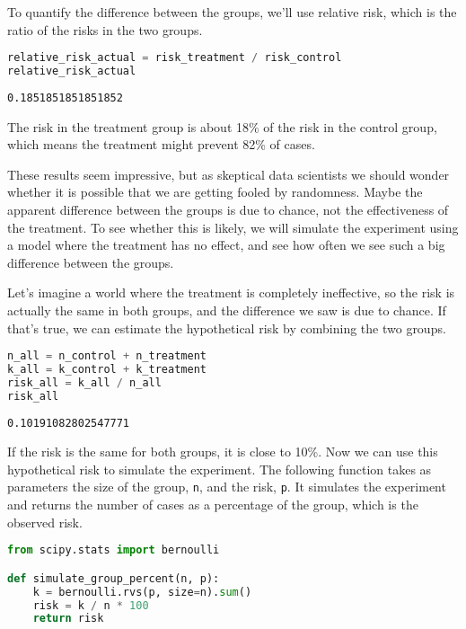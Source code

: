\pagebreak

To quantify the difference between the groups, we'll use relative risk,
which is the ratio of the risks in the two groups.

\begin{lstlisting}[language=Python,style=source]
relative_risk_actual = risk_treatment / risk_control
relative_risk_actual
\end{lstlisting}

\begin{lstlisting}[style=output]
0.1851851851851852
\end{lstlisting}

The risk in the treatment group is about 18\% of the risk in the control
group, which means the treatment might prevent 82\% of cases.

These results seem impressive, but as skeptical data scientists we
should wonder whether it is possible that we are getting fooled by
randomness. Maybe the apparent difference between the groups is due to
chance, not the effectiveness of the treatment. To see whether this is
likely, we will simulate the experiment using a model where the
treatment has no effect, and see how often we see such a big difference
between the groups.

Let's imagine a world where the treatment is completely ineffective, so
the risk is actually the same in both groups, and the difference we saw
is due to chance. If that's true, we can estimate the hypothetical risk
by combining the two groups.

\begin{lstlisting}[language=Python,style=source]
n_all = n_control + n_treatment
k_all = k_control + k_treatment
risk_all = k_all / n_all
risk_all
\end{lstlisting}

\begin{lstlisting}[style=output]
0.10191082802547771
\end{lstlisting}

If the risk is the same for both groups, it is close to 10\%. Now we can
use this hypothetical risk to simulate the experiment. The following
function takes as parameters the size of the group,
\passthrough{\lstinline!n!}, and the risk, \passthrough{\lstinline!p!}.
It simulates the experiment and returns the number of cases as a
percentage of the group, which is the observed risk.

\begin{lstlisting}[language=Python,style=source]
from scipy.stats import bernoulli

def simulate_group_percent(n, p):
    k = bernoulli.rvs(p, size=n).sum()
    risk = k / n * 100
    return risk
\end{lstlisting}

